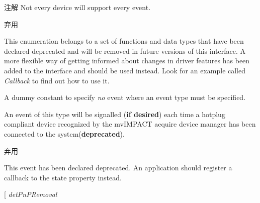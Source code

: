 \begin{DoxyNote}{注解}
Not every device will support every event.
\end{DoxyNote}
\begin{DoxyRefDesc}{弃用}
\item[\hyperlink{deprecated__deprecated000001}{弃用}]This enumeration belongs to a set of functions and data types that have been declared deprecated and will be removed in future versions of this interface. A more flexible way of getting informed about changes in driver features has been added to the interface and should be used instead. Look for an example called {\itshape Callback} to find out how to use it. \end{DoxyRefDesc}
\begin{Desc}
\item[枚举值]\par
\begin{description}
\item[{\em 
\hypertarget{group___common_interface_gga0947eb7d6a73b9baab283cbf65cd8d6ba944e8883a4bd454ef2ff2bcee9451cfb}{det\+None}\label{group___common_interface_gga0947eb7d6a73b9baab283cbf65cd8d6ba944e8883a4bd454ef2ff2bcee9451cfb}
}]A dummy constant to specify {\itshape no} event where an event type must be specified. \item[{\em 
\hypertarget{group___common_interface_gga0947eb7d6a73b9baab283cbf65cd8d6bae72bb800d1cb1bdc884bb666324a410a}{det\+Pn\+P\+Arrival}\label{group___common_interface_gga0947eb7d6a73b9baab283cbf65cd8d6bae72bb800d1cb1bdc884bb666324a410a}
}]An event of this type will be signalled ({\bfseries if desired}) each time a hotplug compliant device recognized by the mv\+I\+M\+P\+A\+C\+T acquire device manager has been connected to the system({\bfseries deprecated}). \begin{DoxyRefDesc}{弃用}
\item[\hyperlink{deprecated__deprecated000002}{弃用}]This event has been declared deprecated. An application should register a callback to the state property instead. \end{DoxyRefDesc}
\item[{\em 
\hypertarget{group___common_interface_gga0947eb7d6a73b9baab283cbf65cd8d6bac951ab7abab67fbaa3249ad87084efaf}{det\+Pn\+P\+Removal}\label{group___common_interface_gga0947eb7d6a73b9baab283cbf65cd8d6bac951ab7abab67fbaa3249ad87084efaf}
}
\end{description}
\end{Desc}
